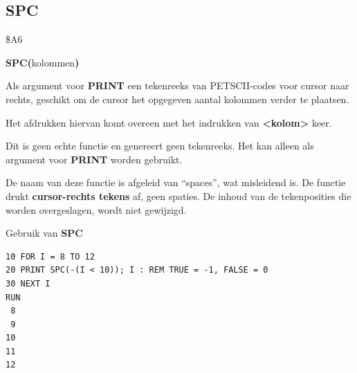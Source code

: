 \subsection{SPC}
\begin{description}[leftmargin=2cm,style=nextline]
\item [Token:]    \$A6

\item [Formaat:]   {\bf SPC(}kolommen{\bf)}

\item [Retourneert:]  Als argument voor {\bf PRINT} een tekenreeks van PETSCII-codes voor cursor naar rechts, geschikt om de cursor het opgegeven aantal kolommen verder te plaatsen.

                  Het afdrukken hiervan komt overeen met het indrukken van \megakey{$\rightarrow$} {\bf <kolom>} keer.

                  Dit is geen echte functie en genereert geen tekenreeks. Het kan alleen als argument voor {\bf PRINT} worden gebruikt.

\item [Opmerkingen:]  De naam van deze functie is afgeleid van ``spaces'', wat misleidend is. De functie drukt {\bf cursor-rechts tekens} af, geen spaties. De inhoud van de tekenposities die worden overgeslagen, wordt niet gewijzigd.

\item [Voorbeeld:]  Gebruik van {\bf SPC}

\begin{tcolorbox}[colback=black,coltext=white]
\verbatimfont{\codefont}
\begin{verbatim}
10 FOR I = 8 TO 12
20 PRINT SPC(-(I < 10)); I : REM TRUE = -1, FALSE = 0
30 NEXT I
RUN
 8
 9
10
11
12
\end{verbatim}
\end{tcolorbox}
\end{description}


\newpage
